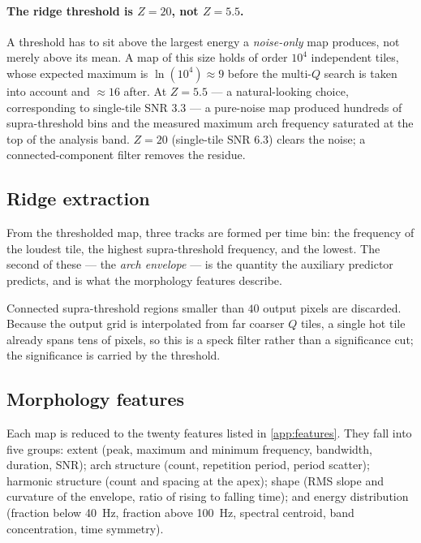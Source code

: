 \paragraph{The ridge threshold is $Z = 20$, not $Z = 5.5$.} A threshold has to
sit above the largest energy a \emph{noise-only} map produces, not merely
above its mean. A map of this size holds of order $10^4$ independent tiles,
whose expected maximum is $\ln(10^4) \approx 9$ before the multi-$Q$ search is
taken into account and $\approx 16$ after. At $Z = 5.5$ --- a natural-looking
choice, corresponding to single-tile SNR $3.3$ --- a pure-noise map produced
hundreds of supra-threshold bins and the measured maximum arch frequency
saturated at the top of the analysis band. $Z = 20$ (single-tile SNR $6.3$)
clears the noise; a connected-component filter removes the residue.

\subsection{Ridge extraction}
\label{sec:methods:ridge}

From the thresholded map, three tracks are formed per time bin: the frequency
of the loudest tile, the highest supra-threshold frequency, and the lowest.
The second of these --- the \emph{arch envelope} --- is the quantity the
auxiliary predictor predicts, and is what the morphology features describe.

Connected supra-threshold regions smaller than $40$ output pixels are
discarded. Because the output grid is interpolated from far coarser $Q$ tiles,
a single hot tile already spans tens of pixels, so this is a speck filter
rather than a significance cut; the significance is carried by the threshold.

\subsection{Morphology features}
\label{sec:methods:features}

Each map is reduced to the twenty features listed in \cref{app:features}.
They fall into five groups: extent (peak, maximum and minimum frequency,
bandwidth, duration, SNR); arch structure (count, repetition period, period
scatter); harmonic structure (count and spacing at the apex); shape (RMS slope
and curvature of the envelope, ratio of rising to falling time); and energy
distribution (fraction below \SI{40}{\hertz}, fraction above
\SI{100}{\hertz}, spectral centroid, band concentration, time symmetry).

